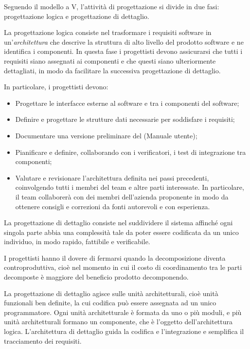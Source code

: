 \documentclass[10pt, a4paper]{article}
\begin{document}
Seguendo il modello a V, l'attività di progettazione si divide in due fasi: progettazione logica e progettazione di dettaglio.

La progettazione logica consiste nel trasformare i requisiti software in un'\textit{architettura\pg} che descrive la struttura di alto livello del prodotto software e ne identifica i componenti.
In questa fase i progettisti devono assicurarsi che tutti i requisiti siano assegnati ai componenti e che questi siano ulteriormente dettagliati, in modo da facilitare la successiva progettazione di dettaglio.

In particolare, i progettisti devono:
\begin{itemize}
    \item Progettare le interfacce esterne al software e tra i componenti del software;
    \item Definire e progettare le strutture dati necessarie per soddisfare i requisiti;
    \item Documentare una versione preliminare del (Manuale utente);
    \item Pianificare e definire, collaborando con i verificatori, i test di integrazione tra componenti;
    \item Valutare e revisionare l'architettura definita nei passi precedenti, coinvolgendo tutti i membri del team e altre parti interessate. In particolare, il team collaborerà con dei membri dell'azienda proponente in modo da ottenere consigli e correzioni da fonti autorevoli e con esperienza.
\end{itemize}

\label{sec:progettazione_di_dettaglio}
La progettazione di dettaglio consiste nel suddividere il sistema affinché ogni singola parte abbia una complessità tale da poter essere codificata da un unico individuo, in modo rapido, fattibile e verificabile.

I progettisti hanno il dovere di fermarsi quando la decomposizione diventa controproduttiva, cioè nel momento in cui il costo di coordinamento tra le parti decomposte è maggiore del beneficio prodotto decomponendo.

La progettazione di dettaglio agisce sulle unità architetturali, cioè unità funzionali ben definite, la cui codifica può essere assegnata ad un unico programmatore.
Ogni unità architetturale è formata da uno o più moduli, e più unità architetturali formano un componente, che è l'oggetto dell'architettura logica.
L'architettura di dettaglio guida la codifica e l'integrazione e semplifica il tracciamento dei requisiti.
\end{document}
